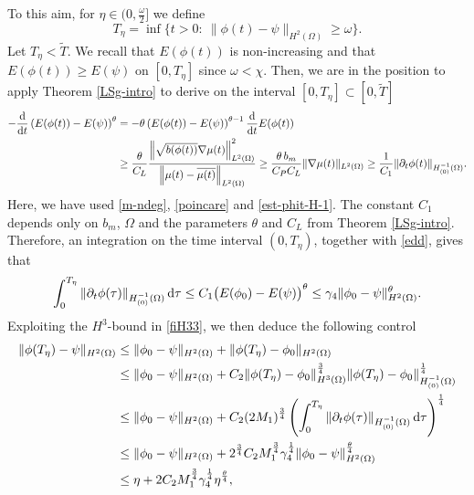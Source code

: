 \documentclass[11pt,reqno]{amsart}
\theoremstyle{remark}
\def\non{\nonumber }
\newcommand \norm[1] {\left\Vert #1\right\Vert}
\def\d{{\rm d}}
\def\ddt{\frac{\d}{\d t}}
\numberwithin{equation}{section}
\def\d{{\rm d}}
\newcommand{\vp}{\phi}
\begin{document}
\smallskip
To this aim, for  $\eta\in (0, \frac{\omega}{2}]$ we define
$$
T_\eta=\inf\{t>0:\ \|\vp(t)-\psi\|_{H^2(\Omega)}\geq \omega \}.
$$
Let $T_\eta< \widetilde{T}$. We recall that $E(\vp(t))$ is
non-increasing and that $E(\vp(t))\geq E(\psi)$ on $[0,T_\eta]$ since $\omega <\chi$. Then, we are in the position to apply Theorem \ref{LSg-intro} to derive on the interval
$[0,T_\eta]\subset [0,\widetilde{T}]$
%
\begin{align*}
 -\ddt \left( E(\vp(t))-E(\psi) \right)^\theta&=
 -\theta \left( E(\vp(t))-E(\psi) \right)^{\theta-1}\ddt E(\vp(t))
 \non\\
&\geq \frac{\theta}{C_L}
\frac{ \norm{ \sqrt{b(\phi(t))} \nabla \mu(t)}_{L^2(\Omega)}^2 }{\norm{\mu(t)-\overline{\mu(t)}}_{L^2(\Omega)} }
\geq 
\frac{\theta \, b_m}{C_P C_L}  \|\nabla \mu (t) \|_{L^2(\Omega)}\geq \frac{1}{C_1} \|\partial_t\vp (t)\|_{H^{-1}_{(0)}(\Omega)}.
 \end{align*}
Here, we have used \eqref{m-ndeg}, \eqref{poincare} and \eqref{est-phit-H-1}. 
The constant $C_1$ depends only on $b_m$, $\Omega$ and the parameters $\theta$ and $C_L$ from Theorem \ref{LSg-intro}.
Therefore, 
an integration on the time interval $(0,T_\eta)$, together with \eqref{edd}, gives that
 \begin{equation}
 \int_0^{T_\eta}\|\partial_t \vp (\tau)\|_{H^{-1}_{(0)}(\Omega)} \, \d \tau\leq
C_1\big(E(\vp_0)-E(\psi)\big)^\theta\leq \gamma_4 \|\vp_0-\psi\|_{H^2(\Omega)}^\theta.\nonumber
 \end{equation}
Exploiting the $H^3$-bound in \eqref{fiH33}, we then deduce the following control
 \begin{align*}
  \|\vp(T_\eta)-\psi\|_{H^2(\Omega)}
 &\leq \|\vp_0-\psi\|_{H^2(\Omega)}
 +\|\vp(T_\eta)-\vp_0\|_{H^2(\Omega)}\non\\
 &\leq \|\vp_0-\psi\|_{H^2(\Omega)}
 + C_2 \|\vp(T_\eta)-\vp_0\|_{H^3(\Omega)}^\frac34
 \|\vp(T_\eta)-\vp_0\|_{H^{-1}_{(0)}(\Omega)}^\frac14 \non\\
 &\leq \|\vp_0-\psi\|_{H^2(\Omega)}
 +  C_2 (2 M_1)^\frac34\left(\int_0^{T_\eta}\|\partial_t\vp(\tau)\|_{H^{-1}_{(0)}(\Omega)}\, \d \tau
 \right)^\frac14\non\\
 &\leq\|\vp_0-\psi\|_{H^2(\Omega)}+2^\frac34 C_2 M_1^{\frac34}\gamma_4^{\frac14}
 \|\vp_0-\psi\|_{H^2(\Omega)}^\frac{\theta}{4}\non\\
 &\leq \eta+2 C_2 M_1^{\frac34}\gamma_4^{\frac14}
 \eta^\frac{\theta}{4},
\end{align*}
\end{document}
